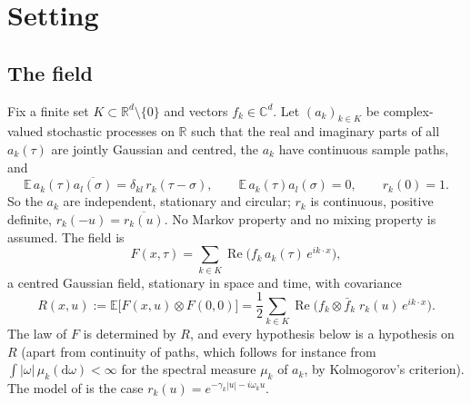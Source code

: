 \documentclass[11pt]{article}
\newcommand{\dd}{\mathrm{d}}
\newcommand{\E}{\mathbb{E}}
\renewcommand{\Re}{\operatorname{Re}}
\theoremstyle{remark}
\begin{document}
\section{Setting}

\subsection{The field}

Fix a finite set $K\subset\mathbb{R}^d\setminus\{0\}$ and vectors
$f_k\in\mathbb{C}^d$. Let $(a_k)_{k\in K}$ be complex-valued stochastic
processes on $\mathbb{R}$ such that the real and imaginary parts of all
$a_k(\tau)$ are jointly Gaussian and centred, the $a_k$ have continuous
sample paths, and
\begin{equation}
  \E\,a_k(\tau)\overline{a_l(\sigma)} = \delta_{kl}\,r_k(\tau-\sigma),
  \qquad \E\,a_k(\tau)a_l(\sigma) = 0, \qquad r_k(0) = 1 .
  \label{eq:cov}
\end{equation}
So the $a_k$ are independent, stationary and circular; $r_k$ is continuous,
positive definite, $r_k(-u) = \overline{r_k(u)}$. No Markov property and no
mixing property is assumed. The field is
\begin{equation}
  F(x,\tau) = \sum_{k\in K}\Re\bigl(f_k\,a_k(\tau)\,e^{ik\cdot x}\bigr),
\end{equation}
a centred Gaussian field, stationary in space and time, with covariance
\begin{equation}
  R(x,u) := \E\bigl[F(x,u)\otimes F(0,0)\bigr]
  = \frac12\sum_{k\in K}\Re\bigl(f_k\otimes\bar f_k\;r_k(u)\,e^{ik\cdot x}\bigr).
  \label{eq:R}
\end{equation}
The law of $F$ is determined by $R$, and every hypothesis below is a
hypothesis on $R$ (apart from continuity of paths, which follows for
instance from $\int|\omega|\,\mu_k(\dd\omega)<\infty$ for the spectral
measure $\mu_k$ of $a_k$, by Kolmogorov's criterion). The model of
\cite{Note} is the case $r_k(u) = e^{-\gamma_k|u| - i\omega_ku}$.
\end{document}
